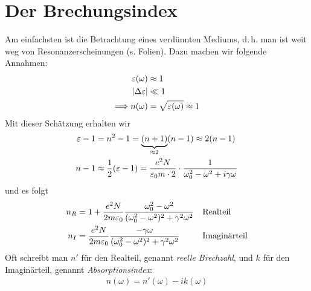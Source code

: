 \section{Der Brechungsindex}
Am einfachsten ist die Betrachtung eines verdünnten Mediums,
d.\,h. man ist weit weg von Resonanzerscheinungen (s. Folien).
Dazu machen wir folgende Annahmen:
\begin{align*}
  \varepsilon(\omega) &\approx 1\\
  |\Delta\varepsilon| &\ll 1\\
  \Longrightarrow n(\omega) &= \sqrt{\varepsilon(\omega)} \approx 1
\end{align*}
Mit dieser Schätzung erhalten wir
\begin{align*}
  \varepsilon - 1 &= n^2-1 = \underbrace{(n+1)}_{\approx 2}(n-1) \approx 2(n-1)\\
  n-1 &\approx \frac{1}{2} (\varepsilon -1) 
        = \frac{e^2N}{\varepsilon_0 m\cdot 2}\cdot
        \frac{1}{\omega_0^2-\omega^2 + i\gamma\omega}
\end{align*}
und es folgt
\begin{align*}
  n_R &= 1 + \frac{e^2N}{2m\varepsilon_0} 
        \frac{\omega_0^2-\omega^2}{(\omega_0^2-\omega^2)^2 + \gamma^2\omega^2}
  && \text{Realteil}\\
  n_I &= \frac{e^2N}{2m\varepsilon_0}
        \frac{-\gamma\omega}{(\omega_0^2-\omega^2)^2 + \gamma^2\omega^2}
  && \text{Imaginärteil}\\
\end{align*}
Oft schreibt man $n'$ für den Realteil, genannt 
\emph{reelle Brechzahl}, und 
$k$ für den Imaginärteil, genannt
\emph{Absorptionsindex}:
\begin{gather*}
  n(\omega) = n'(\omega) - ik(\omega)
\end{gather*}%
%
%



